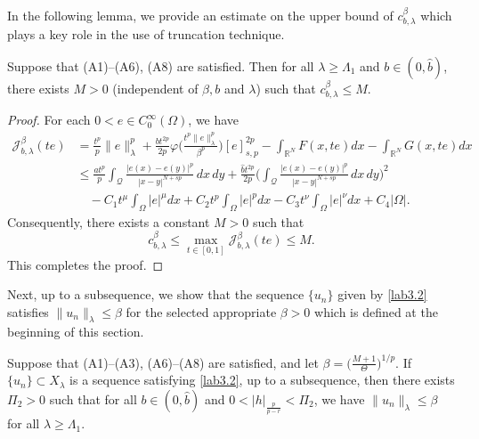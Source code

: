 \documentclass[reqno]{amsart}
\begin{document}
In the following lemma, we provide an estimate on the upper bound of 
$c_{b,\lambda}^\beta$ which plays a key role in the use of truncation technique.

\begin{lemma}\label{L3.2} 
Suppose that {\rm (A1)--(A6), (A8)} are satisfied. Then for all
$\lambda\geq\Lambda_1$ and $b\in(0, \widehat{b})$, there exists $M>0$ 
(independent of $\beta, b$ and $\lambda$) such that $c_{b,\lambda}^\beta\leq M$.
\end{lemma}

\begin{proof}
For each $0<e\in C^\infty_0(\Omega)$, we have
\begin{align*}
 \mathcal{J}^\beta_{b,\lambda}(te)
&= \frac{t^p}{p} \|e\|^p_\lambda+\frac{bt^{2p}}{2p}\varphi
 \Big( \frac{t^p\|e\|^p_\lambda}{\beta^p} \Big)[e]^{2p}_{s,p}-
 \int_{\mathbb{R}^N} F(x,te)dx-\int_{\mathbb{R}^N} G(x,te)dx  \\
&\leq  \frac{at^p}{p}\int_{\mathcal{Q}}\frac{|e(x)-e(y)|^p}{|x-y|^{N+sp}}\,dx\,dy
 +\frac{\widehat{b}t^{2p}}{2p}
 \Big(\int_{\mathcal{Q}}\frac{|e(x)-e(y)|^p}{|x-y|^{N+sp}}\,dx\,dy\Big)^2  \\
&\quad -C_1t^\mu\int_{\Omega}|e|^\mu dx+C_2t^p\int_{\Omega}|e|^pdx
 -C_3t^\nu\int_{\Omega}|e|^\nu dx+C_4|\Omega|.
\end{align*}
Consequently, there exists a constant $M>0$ such that
$$
c_{b,\lambda}^\beta \leq \max_{t\in[0,1]}\mathcal{J}^\beta_{b,\lambda}(te)\leq M.
$$
This completes the proof.
\end{proof}

Next, up to a subsequence, we show that the sequence $\{u_n\}$ given by \eqref{lab3.2} 
satisfies $\|u_n\|_{\lambda}\leq\beta$ for the selected appropriate $\beta>0$ which is 
defined at the beginning of this section.

\begin{lemma}\label{L3.3}
Suppose that {\rm (A1)--(A3), (A6)--(A8)} are satisfied, and let
$\beta=\big(\frac{M+1}{\Theta}\big)^{1/p}$.
If $\{u_n\}\subset X_\lambda$ is a sequence satisfying \eqref{lab3.2}, up to a 
subsequence, then there exists $\Pi_2>0$ such that for all $b\in(0, \widehat{b})$ 
and $0<|h|_{\frac{p}{p-r}}<\Pi_2$, we have $\|u_n\|_\lambda\leq \beta$ for all 
$\lambda\geq\Lambda_1$.
\end{lemma}
\end{document}
